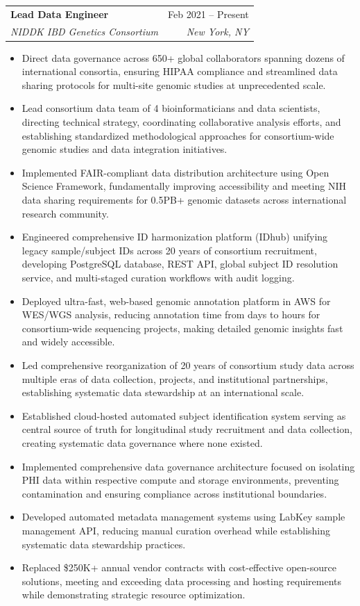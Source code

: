 \documentclass[letterpaper,10]{article}
\makeatletter
\newcommand{\resumeItem}[1]{
  \item\small{
    {#1 \vspace{-2pt}}
  }
}
\newcommand{\resumeSubheading}[4]{
  \vspace{-2pt}\item
    \begin{tabular*}{0.97\textwidth}[t]{l@{\extracolsep{\fill}}r}
      \textbf{#1} & #2 \\
      \textit{\small#3} & \textit{\small #4} \\
    \end{tabular*}\vspace{-7pt}
}
\newcommand{\resumeItemListStart}{\begin{itemize}}
\newcommand{\resumeItemListEnd}{\end{itemize}\vspace{-5pt}}
\makeatother
\begin{document}
    \resumeSubheading
      {Lead Data Engineer}{Feb 2021 -- Present}
      {NIDDK IBD Genetics Consortium}{New York, NY}
      \resumeItemListStart
        \resumeItem{Direct data governance across 650+ global collaborators spanning dozens of international consortia, ensuring HIPAA compliance and streamlined data sharing protocols for multi-site genomic studies at unprecedented scale.}
        \resumeItem{Lead consortium data team of 4 bioinformaticians and data scientists, directing technical strategy, coordinating collaborative analysis efforts, and establishing standardized methodological approaches for consortium-wide genomic studies and data integration initiatives.}
        \resumeItem{Implemented FAIR-compliant data distribution architecture using Open Science Framework, fundamentally improving accessibility and meeting NIH data sharing requirements for 0.5PB+ genomic datasets across international research community.}
        \resumeItem{Engineered comprehensive ID harmonization platform (IDhub) unifying legacy sample/subject IDs across 20 years of consortium recruitment, developing PostgreSQL database, REST API, global subject ID resolution service, and multi-staged curation workflows with audit logging.}
        \resumeItem{Deployed ultra-fast, web-based genomic annotation platform in AWS for WES/WGS analysis, reducing annotation time from days to hours for consortium-wide sequencing projects, making detailed genomic insights fast and widely accessible.}
        \resumeItem{Led comprehensive reorganization of 20 years of consortium study data across multiple eras of data collection, projects, and institutional partnerships, establishing systematic data stewardship at an international scale.}
        \resumeItem{Established cloud-hosted automated subject identification system serving as central source of truth for longitudinal study recruitment and data collection, creating systematic data governance where none existed.}
        \resumeItem{Implemented comprehensive data governance architecture focused on isolating PHI data within respective compute and storage environments, preventing contamination and ensuring compliance across institutional boundaries.}
        \resumeItem{Developed automated metadata management systems using LabKey sample management API, reducing manual curation overhead while establishing systematic data stewardship practices.}
        \resumeItem{Replaced \$250K+ annual vendor contracts with cost-effective open-source solutions, meeting and exceeding data processing and hosting requirements while demonstrating strategic resource optimization.}
      \resumeItemListEnd
\end{document}
